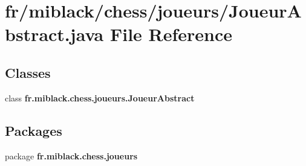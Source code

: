 \section{fr/miblack/chess/joueurs/\-Joueur\-Abstract.java File Reference}
\label{JoueurAbstract_8java}
\subsection*{Classes}
\begin{DoxyCompactItemize}
\item 
class {\bf fr.\-miblack.\-chess.\-joueurs.\-Joueur\-Abstract}
\end{DoxyCompactItemize}
\subsection*{Packages}
\begin{DoxyCompactItemize}
\item 
package {\bf fr.\-miblack.\-chess.\-joueurs}
\end{DoxyCompactItemize}
